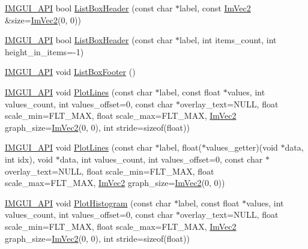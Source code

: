\begin{DoxyCompactItemize}
\item 
\mbox{\hyperlink{imgui_8h_a43829975e84e45d1149597467a14bbf5}{I\+M\+G\+U\+I\+\_\+\+A\+PI}} bool \mbox{\hyperlink{namespace_im_gui_a4003d6a6ab57f2fb43db80c6339a1aed}{List\+Box\+Header}} (const char $\ast$label, const \mbox{\hyperlink{struct_im_vec2}{Im\+Vec2}} \&size=\mbox{\hyperlink{struct_im_vec2}{Im\+Vec2}}(0, 0))
\item 
\mbox{\hyperlink{imgui_8h_a43829975e84e45d1149597467a14bbf5}{I\+M\+G\+U\+I\+\_\+\+A\+PI}} bool \mbox{\hyperlink{namespace_im_gui_a6c5c48e5e5b90365f3f6faaa3307af26}{List\+Box\+Header}} (const char $\ast$label, int items\+\_\+count, int height\+\_\+in\+\_\+items=-\/1)
\item 
\mbox{\hyperlink{imgui_8h_a43829975e84e45d1149597467a14bbf5}{I\+M\+G\+U\+I\+\_\+\+A\+PI}} void \mbox{\hyperlink{namespace_im_gui_a9a0a8f6a4a67280dce7bd91310a83a03}{List\+Box\+Footer}} ()
\item 
\mbox{\hyperlink{imgui_8h_a43829975e84e45d1149597467a14bbf5}{I\+M\+G\+U\+I\+\_\+\+A\+PI}} void \mbox{\hyperlink{namespace_im_gui_a2bc21c56e4796855313804086cca114f}{Plot\+Lines}} (const char $\ast$label, const float $\ast$values, int values\+\_\+count, int values\+\_\+offset=0, const char $\ast$overlay\+\_\+text=N\+U\+LL, float scale\+\_\+min=F\+L\+T\+\_\+\+M\+AX, float scale\+\_\+max=F\+L\+T\+\_\+\+M\+AX, \mbox{\hyperlink{struct_im_vec2}{Im\+Vec2}} graph\+\_\+size=\mbox{\hyperlink{struct_im_vec2}{Im\+Vec2}}(0, 0), int stride=sizeof(float))
\item 
\mbox{\hyperlink{imgui_8h_a43829975e84e45d1149597467a14bbf5}{I\+M\+G\+U\+I\+\_\+\+A\+PI}} void \mbox{\hyperlink{namespace_im_gui_a94a2645d45c96da35b834dc7db93a9f1}{Plot\+Lines}} (const char $\ast$label, float($\ast$values\+\_\+getter)(void $\ast$data, int idx), void $\ast$data, int values\+\_\+count, int values\+\_\+offset=0, const char $\ast$overlay\+\_\+text=N\+U\+LL, float scale\+\_\+min=F\+L\+T\+\_\+\+M\+AX, float scale\+\_\+max=F\+L\+T\+\_\+\+M\+AX, \mbox{\hyperlink{struct_im_vec2}{Im\+Vec2}} graph\+\_\+size=\mbox{\hyperlink{struct_im_vec2}{Im\+Vec2}}(0, 0))
\item 
\mbox{\hyperlink{imgui_8h_a43829975e84e45d1149597467a14bbf5}{I\+M\+G\+U\+I\+\_\+\+A\+PI}} void \mbox{\hyperlink{namespace_im_gui_af7a92b2118981835b5251bfdaac50252}{Plot\+Histogram}} (const char $\ast$label, const float $\ast$values, int values\+\_\+count, int values\+\_\+offset=0, const char $\ast$overlay\+\_\+text=N\+U\+LL, float scale\+\_\+min=F\+L\+T\+\_\+\+M\+AX, float scale\+\_\+max=F\+L\+T\+\_\+\+M\+AX, \mbox{\hyperlink{struct_im_vec2}{Im\+Vec2}} graph\+\_\+size=\mbox{\hyperlink{struct_im_vec2}{Im\+Vec2}}(0, 0), int stride=sizeof(float))

\end{DoxyCompactItemize}
